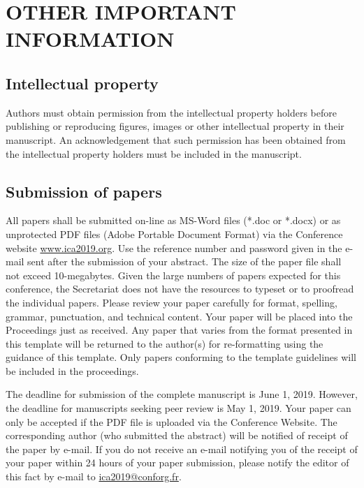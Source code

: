 \section{\uppercase{Other important information}}

\subsection{Intellectual property}

Authors must obtain permission from the intellectual property holders before publishing or reproducing figures, images or other intellectual property in their manuscript. An acknowledgement that such permission has been obtained from the intellectual property holders must be included in the manuscript.

\subsection{Submission of papers}

All papers shall be submitted on-line as MS-Word files (*.doc or *.docx) or as unprotected PDF files (Adobe Portable Document Format) via the Conference website \href{www.ica2019.org}{www.ica2019.org}. Use the reference number and password given in the e-mail sent after the submission of your abstract. The size of the paper file shall not exceed 10-megabytes. Given the large numbers of papers expected for this conference, the Secretariat does not have the resources to typeset or to proofread the individual papers. Please review your paper carefully for format, spelling, grammar, punctuation, and technical content. Your paper will be placed into the Proceedings just as received. Any paper that varies from the format presented in this template will be returned to the author(s) for re-formatting using the guidance of this template. Only papers conforming to the template guidelines will be included in the proceedings.

The deadline for submission of the complete manuscript is June 1, 2019. However, the deadline for manuscripts seeking peer review is May 1, 2019. Your paper can only be accepted if the PDF file is uploaded via the Conference Website. The corresponding author (who submitted the abstract) will be notified of receipt of the paper by e-mail. If you do not receive an e-mail notifying you of the receipt of your paper within 24 hours of your paper submission, please notify the editor of this fact by e-mail to \href{mailto:ica2019@conforg.fr}{ica2019@conforg.fr}.

